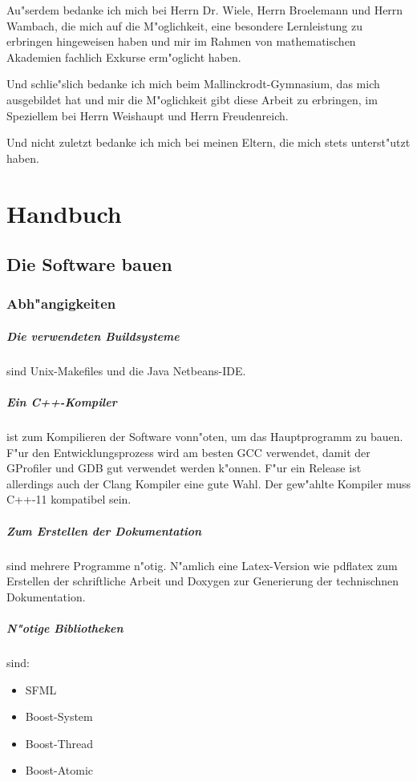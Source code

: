 \documentclass[14pt, a4paper]{report}
\begin{document}
Au"serdem bedanke ich mich bei Herrn Dr. Wiele, Herrn Broelemann und Herrn Wambach, 
die mich auf die M"oglichkeit, eine besondere Lernleistung zu erbringen hingeweisen 
haben und mir im
Rahmen von mathematischen Akademien fachlich Exkurse erm"oglicht haben. 

Und schlie"slich bedanke ich mich beim Mallinckrodt-Gymnasium, das mich ausgebildet hat und mir die M"oglichkeit
gibt diese Arbeit zu erbringen, im Speziellem bei Herrn Weishaupt und Herrn
Freudenreich. 

Und nicht zuletzt bedanke ich mich bei meinen Eltern, die mich stets unterst"utzt haben.
 


\appendix
\chapter{Handbuch}
\section{Die Software bauen}

\subsection{Abh"angigkeiten}
\paragraph{Die verwendeten Buildsysteme} sind Unix-Makefiles und die Java Netbeans-IDE.  
\paragraph{Ein C++-Kompiler} ist zum Kompilieren der Software vonn"oten, um das 
Hauptprogramm zu bauen. F"ur den Entwicklungsprozess wird am besten GCC verwendet, damit
der GProfiler und GDB gut verwendet werden k"onnen. F"ur ein Release ist allerdings auch
der Clang Kompiler eine gute Wahl. Der gew"ahlte Kompiler muss C++-11 kompatibel sein.

\paragraph{Zum Erstellen der Dokumentation} sind mehrere Programme n"otig. N"amlich
eine Latex-Version wie pdflatex zum Erstellen der schriftliche Arbeit und Doxygen zur
Generierung der technischnen Dokumentation.
\paragraph{N"otige Bibliotheken} sind:
\begin{itemize}
\item SFML
\item Boost-System
\item Boost-Thread
\item Boost-Atomic
\end{itemize}
\end{document}
